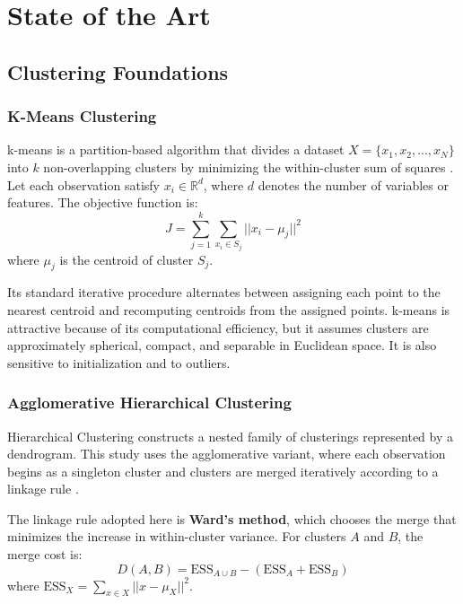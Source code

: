 \chapter{State of the Art}
\label{chap:state-of-the-art}

\section{Clustering Foundations}
\label{sec:clustering-foundations}

\subsection{K-Means Clustering}
k-means is a partition-based algorithm that divides a dataset $X = \{x_1, x_2, ..., x_N\}$ into $k$ non-overlapping clusters by minimizing the within-cluster sum of squares \cite{macqueen1967}. Let each observation satisfy $x_i \in \mathbb{R}^d$, where $d$ denotes the number of variables or features. The objective function is:
\begin{equation}
  J = \sum_{j=1}^{k} \sum_{x_i \in S_j} ||x_i - \mu_j||^2
\end{equation}
where $\mu_j$ is the centroid of cluster $S_j$.

Its standard iterative procedure alternates between assigning each point to the nearest centroid and recomputing centroids from the assigned points. k-means is attractive because of its computational efficiency, but it assumes clusters are approximately spherical, compact, and separable in Euclidean space. It is also sensitive to initialization and to outliers.

\subsection{Agglomerative Hierarchical Clustering}
Hierarchical Clustering constructs a nested family of clusterings represented by a dendrogram. This study uses the agglomerative variant, where each observation begins as a singleton cluster and clusters are merged iteratively according to a linkage rule \cite{ward1963}.

The linkage rule adopted here is \textbf{Ward's method}, which chooses the merge that minimizes the increase in within-cluster variance. For clusters $A$ and $B$, the merge cost is:
\begin{equation}
  D(A, B) = \text{ESS}_{A \cup B} - (\text{ESS}_A + \text{ESS}_B)
\end{equation}
where $\text{ESS}_X = \sum_{x \in X} ||x - \mu_X||^2$.

